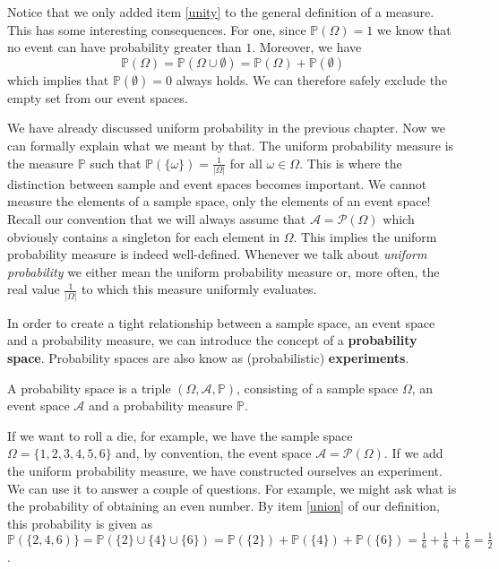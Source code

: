 \documentclass[a4paper,11pt,leqno]{report}
\begin{document}
Notice that we only added item \ref{unity} to the general definition of a measure. This has some
interesting consequences. For one, since $ \mathbb{P}(\Omega) = 1 $ we know that no event can have
probability greater than $ 1 $. Moreover, we have 
\begin{equation}
\mathbb{P}(\Omega) = \mathbb{P}(\Omega \cup \emptyset) = \mathbb{P}(\Omega) + \mathbb{P}(\emptyset)
\end{equation}
which implies that $ \mathbb{P}(\emptyset) = 0 $ always holds. We can therefore safely exclude 
the empty set from our event spaces.

We have already discussed uniform probability in the previous chapter. Now we can formally explain
what we meant by that. The uniform probability measure is the measure $ \mathbb{P} $ such that
$ \mathbb{P}(\{\omega\}) = \frac{1}{|\Omega|} $ for all $ \omega \in \Omega $. This is where the
distinction between sample and event spaces becomes important. We cannot measure the elements of a
sample space, only the elements of an event space! Recall our convention that we will always assume
that $ \mathcal{A} = \mathcal{P}(\Omega) $ which obviously contains a singleton for each element in
$ \Omega $. This implies the uniform probability measure is indeed well-defined. Whenever we talk about
\textit{uniform probability} we either mean the uniform probability measure or, more often, the real
value $ \frac{1}{|\Omega|} $ to which this measure uniformly evaluates.

In order to create a tight relationship between a sample space, an event space and a probability measure,
we can introduce the concept of a \textbf{probability space}. Probability spaces are also know as 
(probabilistic) \textbf{experiments}.

\begin{Definition} \label{ProbabiltySpace}
A probability space is a triple $ (\Omega, \mathcal{A}, \mathbb{P}) $, consisting of a sample space $ \Omega $,
an event space $ \mathcal{A} $ and a probability measure $ \mathbb{P} $.
\end{Definition}

If we want to roll a die, for example, we have the sample space $ \Omega = \{1,2,3,4,5,6\} $ and, by convention,
the event space $ \mathcal{A} = \mathcal{P}(\Omega) $. If we add the uniform probability measure, we have
constructed ourselves an experiment. We can use it to answer a couple of questions. For example, we might ask 
what is the probability of obtaining an even number. By item \ref{union} of our definition, this probability
is given as $ \mathbb{P}(\{2,4,6)\} = \mathbb{P}(\{2\} \cup \{4\} \cup \{6\}) = \mathbb{P}(\{2\}) + \mathbb{P}(\{4\})
+ \mathbb{P}(\{6\}) = \frac{1}{6} + \frac{1}{6} + \frac{1}{6} = \frac{1}{2} $.
\end{document}
